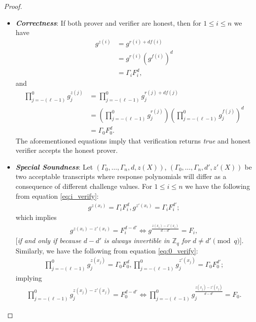 \begin{proof}
  \begin{itemize}
    \item \textit{\textbf{Correctness}}: If both prover and verifier are honest, then for $1\leq i\leq n$ 
      we have 
      \begin{align}\label{eq:i_verify}
        g^{z(i)}&=g^{r(i)+df(i)}\nonumber\\
        &=g^{r(i)}(g^{f(i)})^d\nonumber\\
        &=\Gamma_i F_i^d,
      \end{align}
      and 
      \begin{align}\label{eq:0_verify}
        \prod_{j=-(\ell-1)}^{0}g_j^{z(j)}&=\prod_{j=-(\ell-1)}^{0}g_j^{r(j)+df(j)}\nonumber\\
        &=(\prod_{j=-(\ell-1)}^{0}g_j^{r(j)})(\prod_{j=-(\ell-1)}^{0}g_j^{f(j)})^d\nonumber\\
        &=\Gamma_0 F_0^d.
      \end{align}
      The aforementioned equations imply that verification returns \textit{true} and honest verifier accepts the 
      honest prover.
    \item \textit{\textbf{Special Soundness}}: Let $(\Gamma_0,\dots,\Gamma_n,d,z(X))$, $(\Gamma_0,\dots,\Gamma_n,d',z'(X))$ 
      be two acceptable transcripts where response polynomials will differ as a consequence of different challenge 
      values. For $1\leq i\leq n$ we have the following from equation \ref{eq:i_verify}:
      \begin{align*}
        g^{z(x_i)}=\Gamma_i F_i^d,g^{z'(x_i)}=\Gamma_i F_i^{d'};
      \end{align*}
      which implies
      \begin{align}\label{eq:i_Equality}
        g^{z(x_i)-z'(x_i)}=F_i^{d-d'} \iff g^{\frac{z(x_i)-z'(x_i)}{d-d'}}=F_i,
      \end{align}
      [\textit{if and only if because $d-d'$ is always invertible in $\mathbb{Z}_q$ for $d\neq d'\pmod{q}$}]. Similarly, 
      we have the following from equation \ref{eq:0_verify}:
      \begin{align*}
        \prod_{j=-(\ell-1)}^{0}g_j^{z(x_j)}=\Gamma_0 F_0^d,\prod_{j=-(\ell-1)}^{0}g_j^{z'(x_j)}=\Gamma_0 F_0^{d'};
      \end{align*}
      implying
      \begin{align}\label{eq:0_Equality}
        \prod_{j=-(\ell-1)}^{0}g_j^{z(x_j)-z'(x_j)}=F_0^{d-d'} \iff \prod_{j=-(\ell-1)}^{0}g_j^{\frac{z(x_j)-z'(x_j)}{d-d'}}=F_0.
      \end{align}

\end{itemize}
\end{proof}
